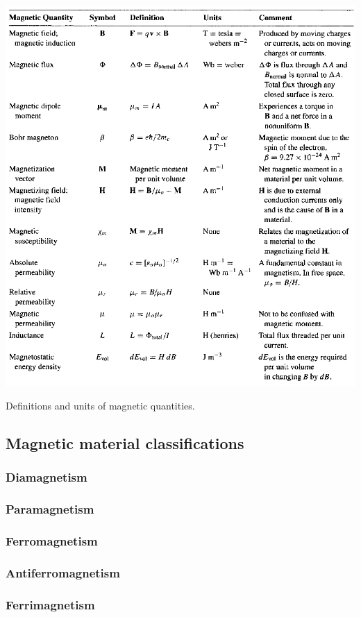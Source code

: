 \begin{table}[ht!]
    \centering
    \includegraphics[width=0.8\linewidth]{images/magnet_formulas.png}
    \caption{Definitions and units of magnetic quantities.}
\end{table}

\subsection{Magnetic material classifications}
\subsubsection{Diamagnetism}
\subsubsection{Paramagnetism}
\subsubsection{Ferromagnetism}
\subsubsection{Antiferromagnetism}
\subsubsection{Ferrimagnetism}

